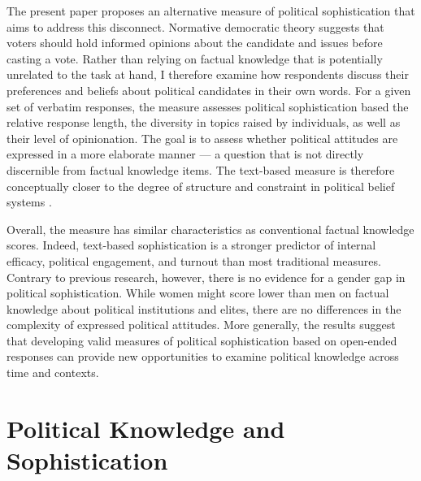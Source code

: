 \documentclass[12pt]{article}
\begin{document}
The present paper proposes an alternative measure of political sophistication that aims to address this disconnect. Normative democratic theory suggests that voters should hold informed opinions about the candidate and issues before casting a vote. Rather than relying on factual knowledge that is potentially unrelated to the task at hand, I therefore examine how respondents discuss their preferences and beliefs about political candidates in their own words. For a given set of verbatim responses, the measure assesses political sophistication based the relative response length, the diversity in topics raised by individuals, as well as their level of opinionation. The goal is to assess whether political attitudes are expressed in a more elaborate manner --- a question that is not directly discernible from factual knowledge items. The text-based measure is therefore conceptually closer to the degree of structure and constraint in political belief systems
\citep[see for example][]{tetlock1983cognitive,luskin1987measuring}. 

Overall, the measure has similar characteristics as conventional factual knowledge scores. Indeed, text-based sophistication is a stronger predictor of internal efficacy, political engagement, and turnout than most traditional measures. Contrary to previous research, however, there is no evidence for a gender gap in political sophistication. While women might score lower than men on factual knowledge about political institutions and elites, there are no differences in the complexity of expressed political attitudes. More generally, the results suggest that developing valid measures of political sophistication based on open-ended responses can provide new opportunities to examine political knowledge across time and contexts. 


\section*{Political Knowledge and Sophistication}
\end{document}
